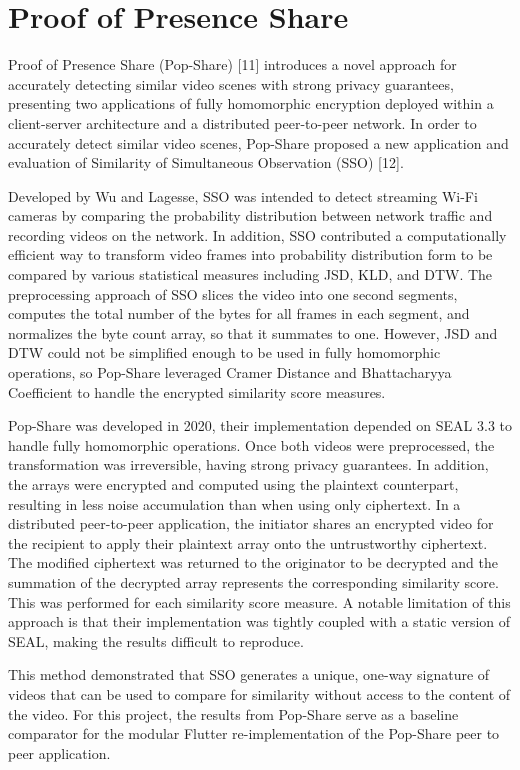 \section{Proof of Presence Share}

Proof of Presence Share (Pop-Share) [11] introduces a novel approach for accurately detecting similar video scenes with strong privacy guarantees, presenting two applications of fully homomorphic encryption deployed within a client-server architecture and a distributed peer-to-peer network. In order to accurately detect similar video scenes, Pop-Share proposed a new application and evaluation of Similarity of Simultaneous Observation (SSO) [12]. 

Developed by Wu and Lagesse, SSO was intended to detect streaming Wi-Fi cameras by comparing the probability distribution between network traffic and recording videos on the network. In addition, SSO contributed a computationally efficient way to transform video frames into probability distribution form to be compared by various statistical measures including JSD, KLD, and DTW. The preprocessing approach of SSO slices the video into one second segments, computes the total number of the bytes for all frames in each segment, and normalizes the byte count array, so that it summates to one. However, JSD and DTW could not be simplified enough to be used in fully homomorphic operations, so Pop-Share leveraged Cramer Distance and Bhattacharyya Coefficient to handle the encrypted similarity score measures.

Pop-Share was developed in 2020, their implementation depended on SEAL 3.3 to handle fully homomorphic operations. Once both videos were preprocessed, the transformation was irreversible, having strong privacy guarantees. In addition, the arrays were encrypted and computed using the plaintext counterpart, resulting in less noise accumulation than when using only ciphertext. In a distributed peer-to-peer application, the initiator shares an encrypted video for the recipient to apply their plaintext array onto the untrustworthy ciphertext. The modified ciphertext was returned to the originator to be decrypted and the summation of the decrypted array represents the corresponding similarity score. This was performed for each similarity score measure. A notable limitation of this approach is that their implementation was tightly coupled with a static version of SEAL, making the results difficult to reproduce.

This method demonstrated that SSO generates a unique, one-way signature of videos that can be used to compare for similarity without access to the content of the video. For this project, the results from Pop-Share serve as a baseline comparator for the modular Flutter re-implementation of the Pop-Share peer to peer application.

